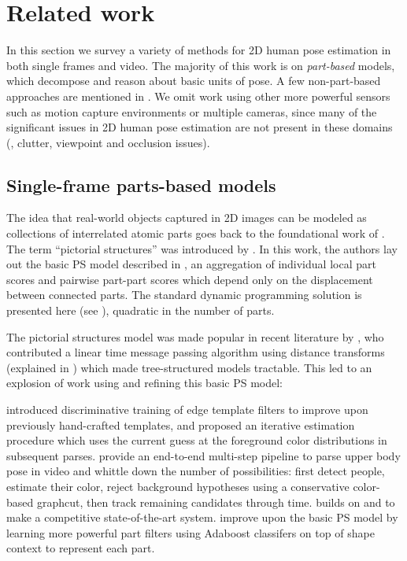 \chapter{Related work}\label{sec:rel}

In this section we survey a variety of methods for 2D human pose estimation in 
both single frames and video.  The majority of this work is on {\em part-based} 
models, which decompose and reason about basic units of pose.  A few 
non-part-based approaches are mentioned in .  We omit work 
using other more powerful sensors such as motion capture environments or 
multiple cameras, since many of the significant issues in 2D human pose 
estimation are not present in these domains (\eg, clutter, viewpoint and 
occlusion issues).

\section{Single-frame parts-based models}\label{sec:partsbased}

The idea that real-world objects captured in 2D images can be modeled as 
collections of interrelated atomic parts goes back to the foundational work of 
\citet{binford71}. The term ``pictorial structures'' was introduced by 
\citet{fischler1973ps}.  In this work, the authors lay out the basic PS model 
described in , an aggregation of individual local part scores and 
pairwise part-part scores which depend only on the displacement between 
connected parts.  The standard dynamic programming solution is presented here 
(see ), quadratic in the number of parts.  

The pictorial structures model was made popular in recent literature by 
\citet{felz05}, who contributed a linear time message passing algorithm using 
distance transforms (explained in ) which made tree-structured 
models tractable.  This led to an explosion of work using and refining this 
basic PS model:

\citet{devaparse} introduced discriminative training of edge template filters 
to improve upon previously hand-crafted templates, and proposed an iterative 
estimation procedure which uses the current guess at the foreground color 
distributions in subsequent parses.  \citet{ferrari08} provide an end-to-end 
multi-step pipeline to parse upper body pose in video and whittle down the 
number of possibilities: first detect people, estimate their color, reject 
background hypotheses using a conservative color-based graphcut, then track 
remaining candidates through time.  \citet{eichner-tr} builds on 
\citet{ferrari08} and \citet{devaparse} to make a competitive state-of-the-art 
system.  \citet{andriluka09} improve upon the basic PS model by learning more 
powerful part filters using Adaboost classifers on top of shape context to 
represent each part.

